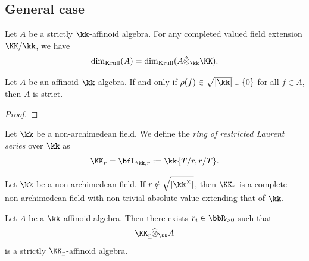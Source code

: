\subsection{General case}


    \begin{proposition}\label{prop:krull_dimension_of_affinoid_domain_under_ground_field_changing}
        Let \(A\) be a strictly \(\kk\)-affinoid algebra.
        For any completed valued field extension \(\KK/\kk\), we have 
        \[ \dim_{\text{Krull}}(A) = \dim_{\text{Krull}}(A \hat{\otimes}_\kk \KK). \]
    \end{proposition}

    \begin{proposition}\label{prop:affinoid_algebra_is_strict_when_radius_in_the_radical_of_valuation_set}
        Let \(A\) be an affinoid \(\kk\)-algebra.
        If and only if \(\rho(f) \in \sqrt{|\kk|} \cup \{0\}\) for all \(f \in A\), then \(A\) is strict.
    \end{proposition}
    \begin{proof}
    \end{proof}
    
    \begin{definition}\label{def:restricted_Laurent_series}
        Let \(\kk\) be a non-archimedean field.
        We define the \emph{ring of restricted Laurent series} over \(\kk\) as 
        \[ \KK_r = \bfL_{\kk,r} := \kk\{T/r,r/T\}. \]
    \end{definition}


    \begin{proposition}\label{prop:restricted_Laurent_series_is_a_field_when_r_is_not_root_of_absolute_value}
        Let \(\kk\) be a non-archimedean field.
        If \(r \notin \sqrt{|\kk^\times|}\), then \(\KK_r\) is a complete non-archimedean field with non-trivial absolute value extending that of \(\kk\).
    \end{proposition}


    \begin{proposition}\label{prop:tensor_K_r_making_A_strictly}
        Let \(A\) be a \(\kk\)-affinoid algebra.
        Then there exists \(r_i \in \bbR_{>0}\) such that
        \[ \KK_{\underline{r}} \widehat{\otimes}_\kk A \]
        is a strictly \(\KK_{\underline{r}}\)-affinoid algebra.
    \end{proposition}

